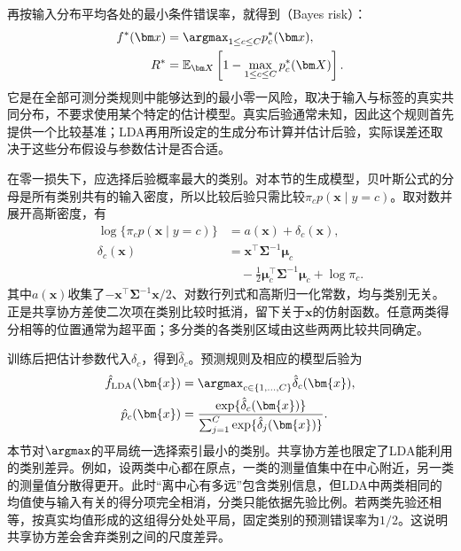 再按输入分布平均各处的最小条件错误率，就得到（Bayes risk）：
\begin{equation}
  \begin{aligned}
    f^\ast(\bm x)&=\argmax_{1\leq c\leq C}p_c^\ast(\bm x),\\
    R^\ast&=\mathbb E_{\bm X}
       \left[1-\max_{1\leq c\leq C}p_c^\ast(\bm X)\right].
  \end{aligned}
  \label{eq:classification-bayes-rule-risk}
\end{equation}
它是在全部可测分类规则中能够达到的最小零一风险，取决于输入与标签的真实共同分布，不要求使用某个特定的估计模型。真实后验通常未知，因此这个规则首先提供一个比较基准；LDA再用所设定的生成分布计算并估计后验，实际误差还取决于这些分布假设与参数估计是否合适。

在零一损失下，应选择后验概率最大的类别。对本节的生成模型，贝叶斯公式的分母是所有类别共有的输入密度，所以比较后验只需比较$\pi_c p(\bm x\mid y=c)$。取对数并展开高斯密度，有
\begin{equation}
  \label{eq:classification-lda-score}
  \begin{aligned}
    \log\{\pi_c p(\bm{x}\mid y=c)\}
      &=a(\bm{x})+\delta_c(\bm{x}),\\
    \delta_c(\bm{x})
      &=\bm{x}^{\top}\bm{\Sigma}^{-1}\bm{\mu}_c\\
      &\quad-\frac12\bm{\mu}_c^{\top}\bm{\Sigma}^{-1}\bm{\mu}_c
        +\log\pi_c .
  \end{aligned}
\end{equation}
其中$a(\bm{x})$收集了$-\bm{x}^{\top}\bm{\Sigma}^{-1}\bm{x}/2$、对数行列式和高斯归一化常数，均与类别无关。正是共享协方差使二次项在类别比较时抵消，留下关于$\bm{x}$的仿射函数。任意两类得分相等的位置通常为超平面；多分类的各类别区域由这些两两比较共同确定。

训练后把估计参数代入$\delta_c$，得到$\hat{\delta}_c$。预测规则及相应的模型后验为
\begin{equation}
  \label{eq:classification-lda-prediction}
  \begin{aligned}
    \hat f_{\mathrm{LDA}}(\bm{x})
      &=\argmax_{c\in\{1,\ldots,C\}}\hat{\delta}_c(\bm{x}),\\
    \hat p_c(\bm{x})
      &=\frac{\exp\{\hat{\delta}_c(\bm{x})\}}
        {\sum_{j=1}^{C}\exp\{\hat{\delta}_j(\bm{x})\}} .
  \end{aligned}
\end{equation}
本节对$\argmax$的平局统一选择索引最小的类别。共享协方差也限定了LDA能利用的类别差异。例如，设两类中心都在原点，一类的测量值集中在中心附近，另一类的测量值分散得更开。此时“离中心有多远”包含类别信息，但LDA中两类相同的均值使与输入有关的得分项完全相消，分类只能依据先验比例。若两类先验还相等，按真实均值形成的这组得分处处平局，固定类别的预测错误率为$1/2$。这说明共享协方差会舍弃类别之间的尺度差异。

